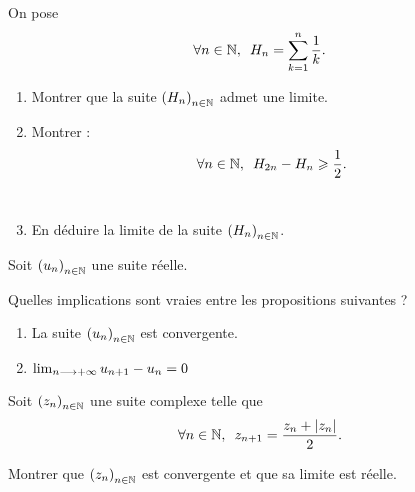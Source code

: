 \begin{corr}
\end{corr}

\begin{exo}
On pose \[\quantifs{\forall n\in\N}H_n=\sum_{k=1}^{n}\dfrac{1}{k}.\]

\begin{enumerate}
\item Montrer que la suite \(\left(H_n\right)_{n\in\mathbb{N}}\) admet une limite. \\

\item Montrer : \[\quantifs{\forall n\in\N}H_{2n}-H_n\geq\dfrac{1}{2}.\] \\

\item En déduire la limite de la suite \(\left(H_n\right)_{n\in\mathbb{N}}\).
\end{enumerate}
\end{exo}

\begin{corr}
\end{corr}

\begin{exo}
Soit \(\left(u_n\right)_{n\in\mathbb{N}}\) une suite réelle.

Quelles implications sont vraies entre les propositions suivantes ?

\begin{enumerate}
\item La suite \(\left(u_n\right)_{n\in\mathbb{N}}\) est convergente. \\

\item \(\lim_{n\longrightarrow+\infty}u_{n+1}-u_n=0\)
\end{enumerate}
\end{exo}

\begin{corr}
\end{corr}

\begin{exo}
Soit \(\left(z_n\right)_{n\in\mathbb{N}}\) une suite complexe telle que \[\quantifs{\forall n\in\N}z_{n+1}=\dfrac{z_n+\abs{z_n}}{2}.\]

Montrer que \(\left(z_n\right)_{n\in\mathbb{N}}\) est convergente et que sa limite est réelle.
\end{exo}

\begin{corr}
\end{corr}

